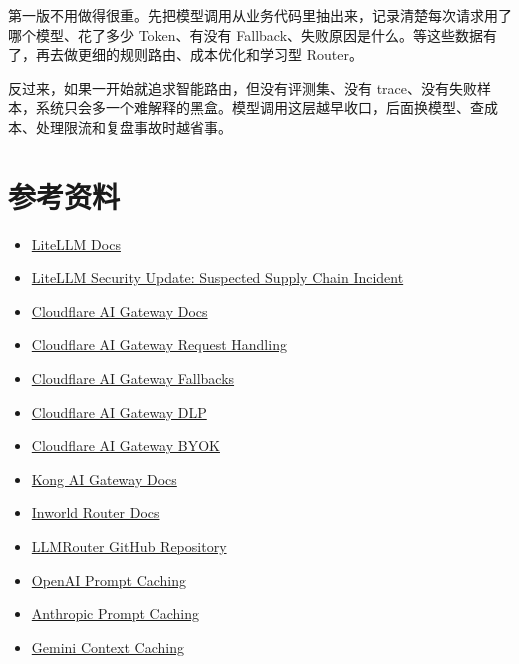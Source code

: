 \documentclass[9pt,a4paper,twocolumn]{ctexart}
\begin{document}
第一版不用做得很重。先把模型调用从业务代码里抽出来，记录清楚每次请求用了哪个模型、花了多少 Token、有没有 Fallback、失败原因是什么。等这些数据有了，再去做更细的规则路由、成本优化和学习型 Router。



反过来，如果一开始就追求智能路由，但没有评测集、没有 trace、没有失败样本，系统只会多一个难解释的黑盒。模型调用这层越早收口，后面换模型、查成本、处理限流和复盘事故时越省事。



\section*{参考资料}

\begin{itemize}[itemsep=1pt, topsep=2pt]
  \item \href{https://docs.litellm.ai/docs/}{LiteLLM Docs}
  \item \href{https://docs.litellm.ai/blog/security-update-march-2026}{LiteLLM Security Update: Suspected Supply Chain Incident}
  \item \href{https://developers.cloudflare.com/ai-gateway/}{Cloudflare AI Gateway Docs}
  \item \href{https://developers.cloudflare.com/ai-gateway/configuration/request-handling/}{Cloudflare AI Gateway Request Handling}
  \item \href{https://developers.cloudflare.com/ai-gateway/configuration/fallbacks/}{Cloudflare AI Gateway Fallbacks}
  \item \href{https://developers.cloudflare.com/ai-gateway/features/dlp/set-up-dlp/}{Cloudflare AI Gateway DLP}
  \item \href{https://developers.cloudflare.com/ai-gateway/configuration/bring-your-own-keys/}{Cloudflare AI Gateway BYOK}
  \item \href{https://developer.konghq.com/ai-gateway/}{Kong AI Gateway Docs}
  \item \href{https://docs.inworld.ai/router/introduction}{Inworld Router Docs}
  \item \href{https://github.com/ulab-uiuc/LLMRouter}{LLMRouter GitHub Repository}
  \item \href{https://platform.openai.com/docs/guides/prompt-caching}{OpenAI Prompt Caching}
  \item \href{https://docs.anthropic.com/en/docs/build-with-claude/prompt-caching}{Anthropic Prompt Caching}
  \item \href{https://ai.google.dev/gemini-api/docs/caching}{Gemini Context Caching}
\end{itemize}
\end{document}
